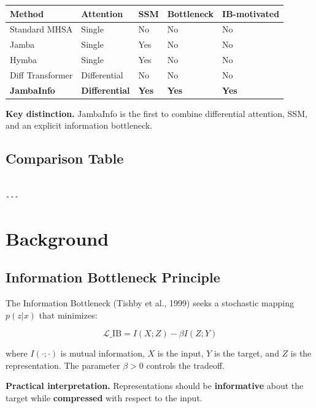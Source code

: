 \begin{table}[H]
\centering
\small
\begin{tabular}{lllll}
\toprule
\textbf{Method} & \textbf{Attention} & \textbf{SSM} & \textbf{Bottleneck} & \textbf{IB-motivated} \\
\midrule
Standard MHSA & Single & No & No & No \\
Jamba & Single & Yes & No & No \\
Hymba & Single & Yes & No & No \\
Diff Transformer & Differential & No & No & No \\
\textbf{JambaInfo} & \textbf{Differential} & \textbf{Yes} & \textbf{Yes} & \textbf{Yes} \\
\bottomrule
\end{tabular}
\end{table}

\textbf{Key distinction.} JambaInfo is the first to combine differential 
attention, SSM, and an explicit information bottleneck.



\subsection{Comparison Table}

\begin{lstlisting}

---
\end{lstlisting}

\section{Background}

\subsection{Information Bottleneck Principle}

The Information Bottleneck (Tishby et al., 1999) seeks a stochastic 
mapping $p(z | x)$ that minimizes:

\[
\mathcal{L}\_\text{IB} = I(X; Z) - \beta I(Z; Y)
\tag{3.1}
\]

where $I(\cdot; \cdot)$ is mutual information, $X$ is the input, $Y$ is 
the target, and $Z$ is the representation. The parameter $\beta > 0$ 
controls the tradeoff.

\textbf{Practical interpretation.} Representations should be \textbf{informative} 
about the target while \textbf{compressed} with respect to the input.

